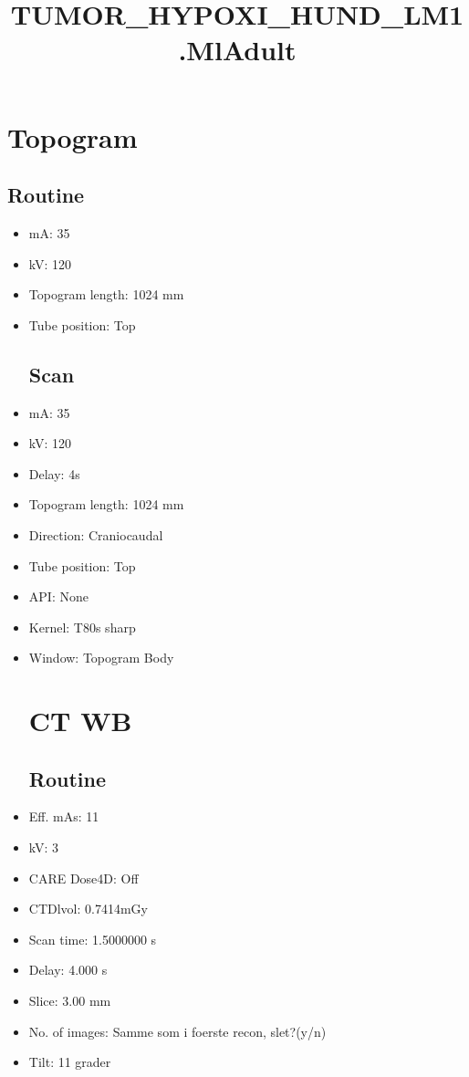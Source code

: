 \documentclass[12pt]{article}
\title{TUMOR\_HYPOXI\_HUND\_LM1.MlAdult}
\begin{document}
\maketitle
\newpage
\tableofcontents
\newpage
{}


\section{Topogram}
\subsection{Routine}
 \begin{itemize}\item mA: 35\item kV: 120\item Topogram length: 1024 mm\item Tube position: Top
\subsection{Scan}
\item mA: 35\item kV: 120\item Delay: 4s\item Topogram length: 1024 mm\item Direction: Craniocaudal\item Tube position: Top\item API: None\item Kernel: T80s sharp\item Window: Topogram Body
\section{CT WB}
\subsection{Routine}
\item Eff. mAs: 11\item kV: 3\item CARE Dose4D: Off\item CTDlvol: 0.7414mGy\item Scan time: 1.5000000 s\item Delay: 4.000 s\item Slice: 3.00 mm\item No. of images: Samme som i foerste recon, slet?(y/n)\item Tilt: 11 grader

\end{itemize}
\end{document}
